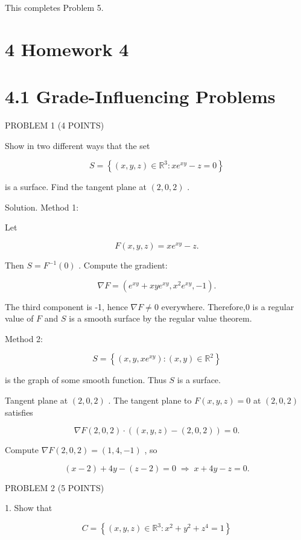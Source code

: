 \documentclass[10pt]{article}
\begin{document}
This completes Problem 5.

\section*{4 Homework 4}

\section*{4.1 Grade-Influencing Problems}

PROBLEM 1 (4 POINTS)

Show in two different ways that the set

\[
S = \left\{  {\left( {x,y,z}\right)  \in  {\mathbb{R}}^{3} : x{e}^{xy} - z = 0}\right\}
\]

is a surface. Find the tangent plane at \(\left( {2,0,2}\right)\) .

Solution. Method 1:

Let

\[
F\left( {x,y,z}\right)  = x{e}^{xy} - z.
\]

Then \(S = {F}^{-1}\left( 0\right)\) . Compute the gradient:

\[
\nabla F = \left( {{e}^{xy} + {xy}{e}^{xy},{x}^{2}{e}^{xy}, - 1}\right) .
\]

The third component is -1, hence \(\nabla F \neq  0\) everywhere. Therefore,0 is a regular value of \(F\) and \(S\) is a smooth surface by the regular value theorem.

Method 2:

\[
S = \left\{  {\left( {x,y,x{e}^{xy}}\right)  : \left( {x,y}\right)  \in  {\mathbb{R}}^{2}}\right\}
\]

is the graph of some smooth function. Thus \(S\) is a surface.

Tangent plane at \(\left( {2,0,2}\right)\) . The tangent plane to \(F\left( {x,y,z}\right)  = 0\) at \(\left( {2,0,2}\right)\) satisfies

\[
\nabla F\left( {2,0,2}\right)  \cdot  \left( {\left( {x,y,z}\right)  - \left( {2,0,2}\right) }\right)  = 0.
\]

Compute \(\nabla F\left( {2,0,2}\right)  = \left( {1,4, - 1}\right)\) , so

\[
\left( {x - 2}\right)  + {4y} - \left( {z - 2}\right)  = 0\; \Rightarrow  \;x + {4y} - z = 0.
\]

PROBLEM 2 (5 POINTS)

1. Show that

\[
C = \left\{  {\left( {x,y,z}\right)  \in  {\mathbb{R}}^{3} : {x}^{2} + {y}^{2} + {z}^{4} = 1}\right\}
\]
\end{document}
